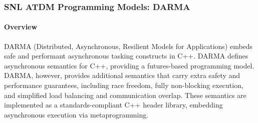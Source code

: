 
\subsubsection{SNL ATDM Programming Models: DARMA} 

\paragraph{Overview} 
DARMA (Distributed, Asynchronous, Resilient Models for Applications) embeds safe and performant asynchronous tasking constructs in C++.
DARMA defines asynchronous semantics for C++, providing a futures-based programming model. 
DARMA, however, provides additional semantics that carry extra safety and performance guarantees,
including race freedom, fully non-blocking execution, and simplified load balancing and communication overlap.
These semantics are implemented as a standards-compliant C++ header library,
embedding asynchronous execution via metaprogramming.


